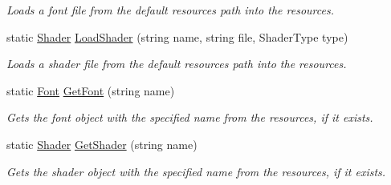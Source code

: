 \begin{DoxyCompactItemize}
\begin{DoxyCompactList}\small\item\em Loads a font file from the default resources path into the resources. \end{DoxyCompactList}\item 
static \hyperlink{class_tri_devs_1_1_tri_engine2_d_1_1_shaders_1_1_shader}{Shader} \hyperlink{class_tri_devs_1_1_tri_engine2_d_1_1_resources_ad6e373745924eece2af3a4923a80fe3b}{Load\-Shader} (string name, string file, Shader\-Type type)
\begin{DoxyCompactList}\small\item\em Loads a shader file from the default resources path into the resources. \end{DoxyCompactList}\item 
static \hyperlink{class_tri_devs_1_1_tri_engine2_d_1_1_text_1_1_font}{Font} \hyperlink{class_tri_devs_1_1_tri_engine2_d_1_1_resources_a1748ae93c5cebf5056a4204c4e557b3c}{Get\-Font} (string name)
\begin{DoxyCompactList}\small\item\em Gets the font object with the specified name from the resources, if it exists. \end{DoxyCompactList}\item 
static \hyperlink{class_tri_devs_1_1_tri_engine2_d_1_1_shaders_1_1_shader}{Shader} \hyperlink{class_tri_devs_1_1_tri_engine2_d_1_1_resources_aa70bf83db079865f59af844c2740433e}{Get\-Shader} (string name)
\begin{DoxyCompactList}\small\item\em Gets the shader object with the specified name from the resources, if it exists. \end{DoxyCompactList}\end{DoxyCompactItemize}
